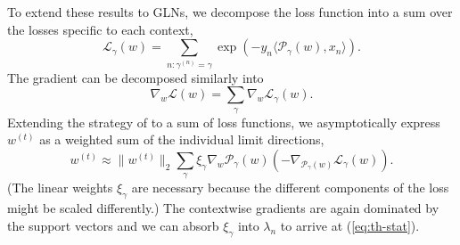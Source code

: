 \documentclass{article}
\theoremstyle{plain}
\theoremstyle{definition}
\theoremstyle{remark}
\begin{document}
To extend these results to GLNs, we decompose the loss function into a sum over the losses specific to each context,
\begin{equation}
    \mathcal{L}_{\gamma}(w)=\sum_{n:\gamma^{(n)}=\gamma}\exp(-y_n\langle\mathcal{P}_{\gamma}(w),x_n\rangle).
\end{equation}
The gradient can be decomposed similarly into
\begin{equation}
    \nabla_w\mathcal{L}(w)=\sum_{\gamma}\nabla_w\mathcal{L}_{\gamma}(w).
\end{equation}
Extending the strategy of \citet{gunasekar_implicit_2018} to a sum of loss functions, we asymptotically express $w^{(t)}$ as a weighted sum of the individual limit directions,
\begin{equation}
    w^{(t)}\approx \|w^{(t)}\|_2\sum_{\gamma}\xi_{\gamma}\nabla_w\mathcal{P}_{\gamma}(w)(-\nabla_{\mathcal{P}_{\gamma}(w)}\mathcal{L}_{\gamma}(w)).
\end{equation}
(The linear weights $\xi_{\gamma}$ are necessary because the different components of the loss might be scaled differently.)
The contextwise gradients are again dominated by the support vectors and we can absorb $\xi_{\gamma}$ into $\lambda_n$ to arrive at (\ref{eq:th-stat}).

\end{document}
